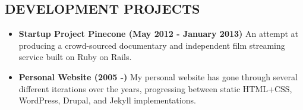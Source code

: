 \documentclass[line, overlapped]{res}
\begin{document}
\begin{resume}
    \section{DEVELOPMENT PROJECTS}
        \begin{itemize}[leftmargin=10pt]
        \item \textbf{Startup Project Pinecone (May 2012 - January 2013)} An attempt at producing a crowd-sourced documentary and independent film streaming service built on Ruby on Rails.
        \item \textbf{Personal Website (2005 -)} My personal website has gone through several different iterations over the years, progressing between static HTML+CSS, WordPress, Drupal, and Jekyll implementations.
        \end{itemize}

\end{resume}
\end{document}
